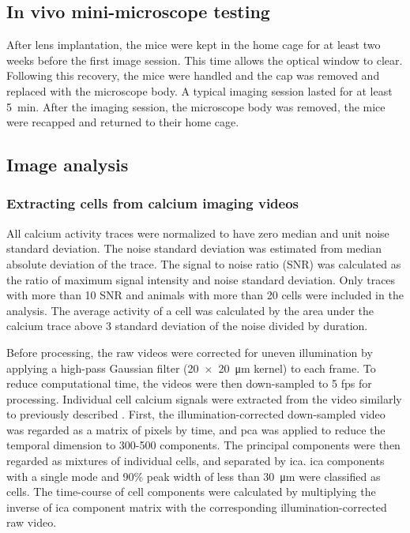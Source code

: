 \subsection{In vivo mini-microscope testing}
After lens implantation, the mice were kept in the home cage for at least two weeks before the first image session. This time allows the optical window to clear. Following this recovery, the mice were handled and the cap was removed and replaced with the microscope body. A typical imaging session lasted for at least \SI{5}{\minute}. After the imaging session, the microscope body was removed, the mice were recapped and returned to their home cage.

\subsection{Image analysis}

\subsubsection{Extracting cells from calcium imaging videos}

All calcium activity traces were normalized to have zero median and unit noise standard deviation. The noise standard deviation was estimated from median absolute deviation of the trace. The signal to noise ratio (SNR) was calculated as the ratio of maximum signal intensity and noise standard deviation. Only traces with more than 10 SNR and animals with more than 20 cells were included in the analysis. The average activity of a cell was calculated by the area under the calcium trace above 3 standard deviation of the noise divided by duration.

Before processing, the raw videos were corrected for uneven illumination by applying a high-pass Gaussian filter (\SI{20 x 20}{\um} kernel) to each frame. To reduce computational time, the videos were then down-sampled to 5 fps for processing. Individual cell calcium signals were extracted from the video similarly to previously described \citep{mukamel09}. First, the illumination-corrected down-sampled video was regarded as a matrix of pixels by time, and \gls{pca} was applied to reduce the temporal dimension to 300-500 components. The principal components were then regarded as mixtures of individual cells, and separated by \gls{ica}. \Gls{ica} components with a single mode and 90\% peak width of less than \SI{30}{\um} were classified as cells. The time-course of cell components were calculated by multiplying the inverse of \gls{ica} component matrix with the corresponding illumination-corrected raw video.


